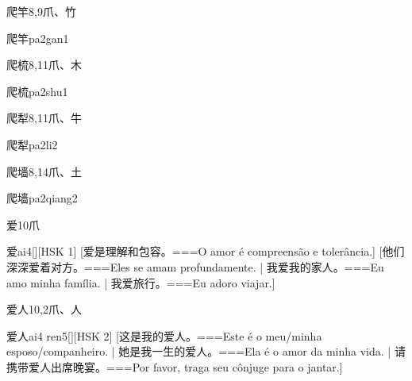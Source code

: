 \begin{Entry}{爬竿}{8,9}{⽖、⽵}
  \begin{Phonetics}{爬竿}{pa2gan1}
  \end{Phonetics}
\end{Entry}

\begin{Entry}{爬梳}{8,11}{⽖、⽊}
  \begin{Phonetics}{爬梳}{pa2shu1}
  \end{Phonetics}
\end{Entry}

\begin{Entry}{爬犁}{8,11}{⽖、⽜}
  \begin{Phonetics}{爬犁}{pa2li2}
  \end{Phonetics}
\end{Entry}

\begin{Entry}{爬墙}{8,14}{⽖、⼟}
  \begin{Phonetics}{爬墙}{pa2qiang2}
  \end{Phonetics}
\end{Entry}

\begin{Entry}{爱}{10}{⽖}
  \begin{Phonetics}{爱}{ai4}[][HSK 1]
    [爱是理解和包容。===O amor é compreensão e tolerância.]
    [他们深深爱着对方。===Eles se amam profundamente. | 我爱我的家人。===Eu amo minha família. | 我爱旅行。===Eu adoro viajar.]
  \end{Phonetics}
\end{Entry}

\begin{Entry}{爱人}{10,2}{⽖、⼈}
  \begin{Phonetics}{爱人}{ai4 ren5}[][HSK 2]
    [这是我的爱人。===Este é o meu/minha esposo/companheiro. | 她是我一生的爱人。===Ela é o amor da minha vida. | 请携带爱人出席晚宴。===Por favor, traga seu cônjuge para o jantar.]
  \end{Phonetics}
\end{Entry}

